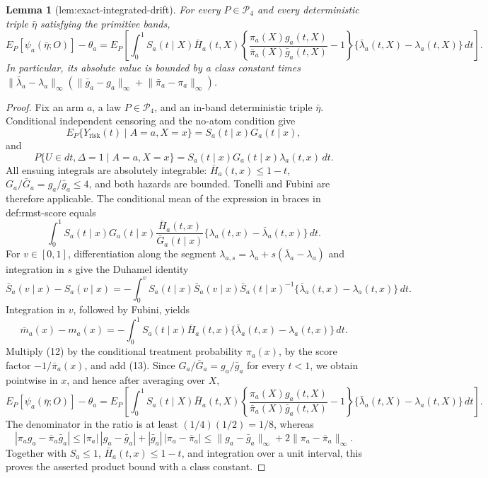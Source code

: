 \documentclass{article}
\newtheorem{lemma}{Lemma}
\begin{document}
\begin{lemma}[lem:exact-integrated-drift]\label{lem:exact-integrated-drift}
For every \(P\in\mathcal P_4\) and every deterministic triple \(\bar\eta\) satisfying the primitive bands, \[E_P[\psi_a(\bar\eta;O)]-\theta_a=E_P\!\left[\int_0^1S_a(t\mid X)\bar H_a(t,X)\left\{\frac{\pi_a(X)g_a(t,X)}{\bar\pi_a(X)\bar g_a(t,X)}-1\right\}\{\bar\lambda_a(t,X)-\lambda_a(t,X)\}\,dt\right].\] In particular, its absolute value is bounded by a class constant times \(\lVert\bar\lambda_a-\lambda_a\rVert_\infty(\lVert\bar g_a-g_a\rVert_\infty+\lVert\bar\pi_a-\pi_a\rVert_\infty)\).
\end{lemma}
\begin{proof}
Fix an arm \(a\), a law \(P\in\mathcal P_4\), and an in-band deterministic triple \(\bar\eta\).  Conditional independent censoring and the no-atom condition give
\[
 E_P\{Y_{\mathrm{risk}}(t)\mid A=a,X=x\}=S_a(t\mid x)G_a(t\mid x),
\]
and
\[
 P\{U\in dt,\Delta=1\mid A=a,X=x\}
 =S_a(t\mid x)G_a(t\mid x)\lambda_a(t,x)\,dt.
\]
All ensuing integrals are absolutely integrable: \(\bar H_a(t,x)\le1-t\), \(G_a/\bar G_a=g_a/\bar g_a\le4\), and both hazards are bounded.  Tonelli and Fubini are therefore applicable.  The conditional mean of the expression in braces in def:rmst-score equals
\[
 \int_0^1 S_a(t\mid x)G_a(t\mid x)
 \frac{\bar H_a(t,x)}{\bar G_a(t\mid x)}
 \{\lambda_a(t,x)-\bar\lambda_a(t,x)\}\,dt. \tag{12}
\]
For \(v\in[0,1]\), differentiation along the segment
\(\lambda_{a,s}=\lambda_a+s(\bar\lambda_a-\lambda_a)\) and integration in \(s\) give the Duhamel identity
\[
 \bar S_a(v\mid x)-S_a(v\mid x)
 =-\int_0^v S_a(t\mid x)\bar S_a(v\mid x)\bar S_a(t\mid x)^{-1}
 \{\bar\lambda_a(t,x)-\lambda_a(t,x)\}\,dt.
\]
Integration in \(v\), followed by Fubini, yields
\[
 \bar m_a(x)-m_a(x)
 =-\int_0^1S_a(t\mid x)\bar H_a(t,x)
 \{\bar\lambda_a(t,x)-\lambda_a(t,x)\}\,dt. \tag{13}
\]
Multiply (12) by the conditional treatment probability \(\pi_a(x)\), by the score factor \(-1/\bar\pi_a(x)\), and add (13).  Since
\(G_a/\bar G_a=g_a/\bar g_a\) for every \(t<1\), we obtain pointwise in \(x\), and hence after averaging over \(X\),
\[
 E_P[\psi_a(\bar\eta;O)]-\theta_a
 =E_P\!\left[\int_0^1S_a(t\mid X)\bar H_a(t,X)
 \left\{\frac{\pi_a(X)g_a(t,X)}{\bar\pi_a(X)\bar g_a(t,X)}-1\right\}
 \{\bar\lambda_a(t,X)-\lambda_a(t,X)\}\,dt\right].
\]
The denominator in the ratio is at least \((1/4)(1/2)=1/8\), whereas
\[
 |\pi_ag_a-\bar\pi_a\bar g_a|
 \le |\pi_a|\,|g_a-\bar g_a|+|\bar g_a|\,|\pi_a-\bar\pi_a|
 \le \lVert g_a-\bar g_a\rVert_\infty+2\lVert\pi_a-\bar\pi_a\rVert_\infty.
\]
Together with \(S_a\le1\), \(\bar H_a(t,x)\le1-t\), and integration over a unit interval, this proves the asserted product bound with a class constant.
\end{proof}
\end{document}
